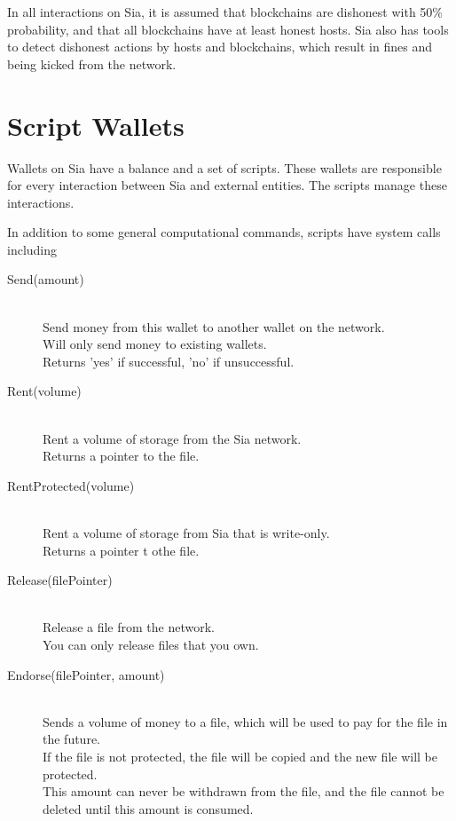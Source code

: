 \documentclass[twocolumn]{article}
\begin{document}
In all interactions on Sia, it is assumed that blockchains are dishonest with 50\% probability, and that all blockchains have at least \inversemaxcorruption{} honest hosts.
Sia also has tools to detect dishonest actions by hosts and blockchains, which result in fines and being kicked from the network.

\section{Script Wallets}

Wallets on Sia have a balance and a set of scripts.
These wallets are responsible for every interaction between Sia and external entities.
The scripts manage these interactions.

In addition to some general computational commands, scripts have system calls including

\begin{description}
	\item[Send(amount)] \hfill \\
	Send money from this wallet to another wallet on the network. \\
	Will only send money to existing wallets. \\
	Returns 'yes' if successful, 'no' if unsuccessful.
	\item[Rent(volume)] \hfill \\
	Rent a volume of storage from the Sia network. \\
	Returns a pointer to the file.
	\item[RentProtected(volume)] \hfill \\
	Rent a volume of storage from Sia that is write-only. \\
	Returns a pointer t othe file.
	\item[Release(filePointer)] \hfill \\
	Release a file from the network. \\
	You can only release files that you own.
	\item[Endorse(filePointer, amount)] \hfill \\
	Sends a volume of money to a file, which will be used to pay for the file in the future. \\
	If the file is not protected, the file will be copied and the new file will be protected. \\
	This amount can never be withdrawn from the file, and the file cannot be deleted until this amount is consumed.
\end{description}
\end{document}
